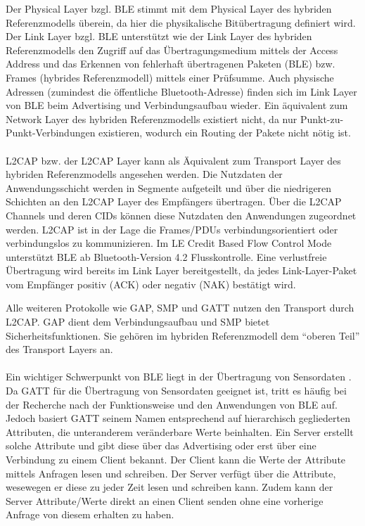 Der Physical Layer bzgl. BLE stimmt mit dem Physical Layer des hybriden Referenzmodells überein, da hier die physikalische Bitübertragung definiert wird. Der Link Layer bzgl. BLE unterstützt wie der Link Layer des hybriden Referenzmodells den Zugriff auf das Übertragungsmedium mittels der Access Address und das Erkennen von fehlerhaft übertragenen Paketen (BLE) bzw. Frames (hybrides Referenzmodell) mittels einer Prüfsumme. Auch physische Adressen (zumindest die öffentliche Bluetooth-Adresse) finden sich im Link Layer von BLE beim Advertising und Verbindungsaufbau wieder. Ein äquivalent zum Network Layer des hybriden Referenzmodells existiert nicht, da nur Punkt-zu-Punkt-Verbindungen existieren, wodurch ein Routing der Pakete nicht nötig ist. \cite{Baun2019_36-40}
\\\\
L2CAP bzw. der L2CAP Layer kann als Äquivalent zum Transport Layer des hybriden Referenzmodells angesehen werden. Die Nutzdaten der Anwendungsschicht werden in Segmente aufgeteilt und über die niedrigeren Schichten an den L2CAP Layer des Empfängers übertragen. Über die L2CAP Channels und deren CIDs können diese Nutzdaten den Anwendungen zugeordnet werden. L2CAP ist in der Lage die Frames/PDUs verbindungsorientiert oder verbindungslos zu kommunizieren. Im LE Credit Based Flow Control Mode unterstützt BLE ab Bluetooth-Version 4.2 Flusskontrolle. Eine verlustfreie Übertragung wird bereits im Link Layer bereitgestellt, da jedes Link-Layer-Paket vom Empfänger positiv (ACK) oder negativ (NAK) bestätigt wird.

Alle weiteren Protokolle wie GAP, SMP und GATT nutzen den Transport durch L2CAP. GAP dient dem Verbindungsaufbau und SMP bietet Sicherheitsfunktionen. Sie gehören im hybriden Referenzmodell dem "`oberen Teil"' des Transport Layers an.
\\\\
Ein wichtiger Schwerpunkt von BLE liegt in der Übertragung von Sensordaten \cite{BtDataTransfer}. Da GATT für die Übertragung von Sensordaten geeignet ist, tritt es häufig bei der Recherche nach der Funktionsweise und den Anwendungen von BLE auf. Jedoch basiert GATT seinem Namen entsprechend auf hierarchisch gegliederten Attributen, die unteranderem veränderbare Werte beinhalten. Ein Server erstellt solche Attribute und gibt diese über das Advertising oder erst über eine Verbindung zu einem Client bekannt. Der Client kann die Werte der Attribute mittels Anfragen lesen und schreiben. Der Server verfügt über die Attribute, wesewegen er diese zu jeder Zeit lesen und schreiben kann. Zudem kann der Server Attribute/Werte direkt an einen Client senden ohne eine vorherige Anfrage von diesem erhalten zu haben. 

